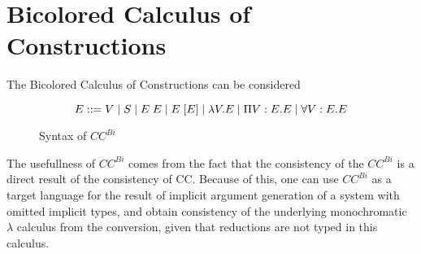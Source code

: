 \section{Bicolored Calculus of Constructions}

The Bicolored Calculus of Constructions \citep{luther2001more}
can be considered 
\begin{figure}[h]
\[ 
E ::= V 
 \; | \; S 
 \; | \; E\;E 
 \; | \; E\;[E]
 \; | \; \lambda V . E 
 \; | \; \Pi V : E . E 
 \; | \; \forall V : E . E 
\]
\caption{Syntax of $CC^{Bi}$}
\label{icc:syntax}
\end{figure}

The usefullness of $CC^{Bi}$ comes from the fact that the
consistency of the $CC^{Bi}$ is a direct result of the consistency of CC.
Because of this, one can use $CC^{Bi}$ as a target language for the result of implicit argument 
generation of a system with omitted implicit types, and obtain consistency of 
the underlying monochromatic $\lambda$ calculus from the conversion,
given that reductions are not typed in this calculus.

